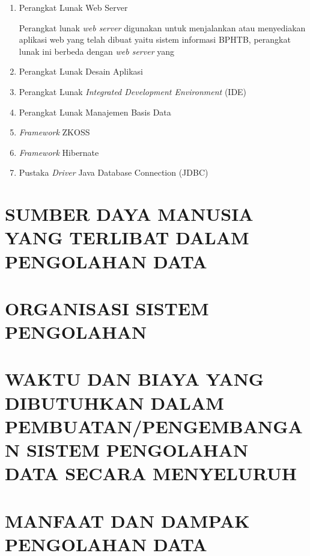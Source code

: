 \documentclass[pdftex,12pt, oneside]{article}
\begin{document}
\begin{enumerate}[1.]
  \item Perangkat Lunak Web Server
  
Perangkat lunak \textit{web server} digunakan untuk menjalankan atau menyediakan aplikasi web yang telah dibuat yaitu sistem informasi BPHTB, perangkat lunak ini berbeda dengan \textit{web server} yang 
  
  \item Perangkat Lunak Desain Aplikasi
  
  \item Perangkat Lunak \textit{Integrated Development Environment} (IDE)
  
  \item Perangkat Lunak Manajemen Basis Data
  
  \item \textit{Framework} ZKOSS
  
  \item \textit{Framework} Hibernate
  
  \item Pustaka \textit{Driver} Java Database Connection (JDBC)
\end{enumerate}

\section{SUMBER DAYA MANUSIA YANG TERLIBAT DALAM PENGOLAHAN DATA}


\section{ORGANISASI SISTEM PENGOLAHAN}


\section{WAKTU DAN BIAYA YANG DIBUTUHKAN DALAM PEMBUATAN/PENGEMBANGAN SISTEM PENGOLAHAN DATA SECARA MENYELURUH}


\section{MANFAAT DAN DAMPAK PENGOLAHAN DATA}
\end{document}
